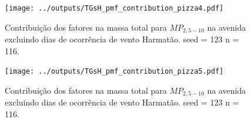 
\begin{landscape}
  \begin{figure}
    \centering
    \begin{minipage}[b]{0.45\linewidth}
      \texttt{[image: ../outputs/TGsH\_pmf\_contribution\_pizza4.pdf]}
      \caption{Contribuição dos fatores na massa total para $MP_{2,5-10}$ na avenida
               excluindo dias de ocorrência de vento Harmatão. seed = 123 n = 116.
               \label{fig:TGsH_contribution4}}
    \end{minipage}%
    \hspace{0.5cm}
    \begin{minipage}[b]{0.45\linewidth}
      
    \end{minipage}
  \end{figure}
\end{landscape}

\begin{landscape}
  \begin{figure}
    \centering
    \begin{minipage}[b]{0.45\linewidth}
      \texttt{[image: ../outputs/TGsH\_pmf\_contribution\_pizza5.pdf]}
      \caption{Contribuição dos fatores na massa total para $MP_{2,5-10}$ na avenida
               excluindo dias de ocorrência de vento Harmatão. seed = 123 n = 116.
               \label{fig:TGsH_contribution5}}
    \end{minipage}%
    \hspace{0.5cm}
    \begin{minipage}[b]{0.45\linewidth}
      
    \end{minipage}
  \end{figure}
\end{landscape}


